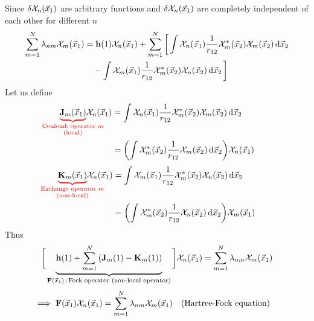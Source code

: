 \documentclass[12pt,a4paper,titlepage]{article}
\newcommand{\trm}[1]{\textrm{#1}} %
\newcommand{\Chi}{\mathcal{X}} %
\begin{document}
Since $\var{\Chi_{n}(\vec{x}_{1})}$ are arbitrary functions and $\var{\Chi_{n}(\vec{x}_{1})}$ are completely independent of each other for different $n$
\begin{equation}
\begin{aligned}
\sum_{m=1}^{N}\lambda_{nm}\Chi_{m}(\vec{x}_{1})&=\vb{h}(1)\Chi_{n}(\vec{x}_{1})+\sum_{m=1}^{N}\bigg[\int\Chi_{n}(\vec{x}_{1})\frac{1}{r_{12}}\Chi_{m}^{*}(\vec{x}_{2})\Chi_{m}(\vec{x}_{2})\dd{\vec{x}_{2}}\\
&\quad-\int\Chi_{m}(\vec{x}_{1})\frac{1}{r_{12}}\Chi_{m}^{*}(\vec{x}_{2})\Chi_{n}(\vec{x}_{2})\dd{\vec{x}_{2}}\bigg]
\end{aligned}
\end{equation}
Let us define
\begin{equation}
\begin{aligned}
{\color{red}\underbrace{\color{black}\vb{J}_{m}(\vec{x}_{1})}_{\mathclap{\substack{\trm{Coulomb operator $m$}\\\trm{(local)}}}}}\Chi_{n}(\vec{x}_{1})&=\int\Chi_{n}(\vec{x}_{1})\frac{1}{r_{12}}\Chi_{m}^{*}(\vec{x}_{2})\Chi_{m}(\vec{x}_{2})\dd{\vec{x}_{2}}\\
&=\qty(\int\Chi_{m}^{*}(\vec{x}_{2})\frac{1}{r_{12}}\Chi_{m}(\vec{x}_{2})\dd{\vec{x}_{2}})\Chi_{n}(\vec{x}_{1})
\end{aligned}
\end{equation}
\begin{equation}
\begin{aligned}
{\color{red}\underbrace{\color{black}\vb{K}_{m}(\vec{x}_{1})}_{\mathclap{\substack{\trm{Exchange operator $m$}\\\trm{(non-local)}}}}}\Chi_{n}(\vec{x}_{1})&=\int\Chi_{m}(\vec{x}_{1})\frac{1}{r_{12}}\Chi_{m}^{*}(\vec{x}_{2})\Chi_{n}(\vec{x}_{2})\dd{\vec{x}_{2}}\\
&=\qty(\int\Chi_{m}^{*}(\vec{x}_{2})\frac{1}{r_{12}}\Chi_{n}(\vec{x}_{2})\dd{\vec{x}_{2}})\Chi_{m}(\vec{x}_{1})
\end{aligned}
\end{equation}
Thus
\begin{equation}
\bigg[\underbrace{\vb{h}(1)+\sum_{m=1}^{N}\qty(\vb{J}_{m}(1)-\vb{K}_{m}(1))}_{\vb{F}(\vec{x}_{1})\,:\,\trm{Fock operator (non-local operator)}}\bigg]\Chi_{n}(\vec{x}_{1})=\sum_{m=1}^{N}\lambda_{nm}\Chi_{m}(\vec{x}_{1})
\end{equation}
\begin{equation}
\implies \vb{F}(\vec{x}_{1})\Chi_{n}(\vec{x}_{1})=\sum_{m=1}^{N}\lambda_{nm}\Chi_{m}(\vec{x}_{1})\qq{(Hartree-Fock equation)}
\end{equation}
\end{document}
